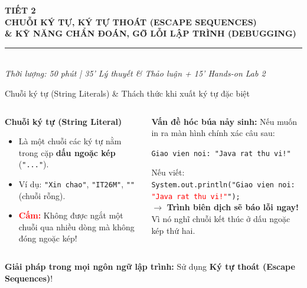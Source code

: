 \documentclass[aspectratio=169, 10pt]{beamer}
\begin{document}
\begin{frame}[plain]
  \begin{center}
    \vspace{1.5cm}
    {\Huge \textcolor{UniNavy}{\textbf{TIẾT 2}}}\\[4mm]
    {\Large \textbf{CHUỖI KÝ TỰ, KÝ TỰ THOÁT (ESCAPE SEQUENCES)}}\\[2mm]
    {\large \textbf{\& KỸ NĂNG CHẨN ĐOÁN, GỠ LỖI LẬP TRÌNH (DEBUGGING)}}\\[6mm]
    \rule{0.5\textwidth}{1pt}\\[4mm]
    \textit{\small Thời lượng: 50 phút | 35' Lý thuyết \& Thảo luận + 15' Hands-on Lab 2}
  \end{center}
\end{frame}

\begin{frame}{Chuỗi ký tự (String Literals) \& Thách thức khi xuất ký tự đặc biệt}
  \begin{columns}
    \begin{block}{\textbf{Chuỗi ký tự (String Literal)}}
      \begin{itemize}
        \item Là một chuỗi các ký tự nằm trong cặp \textbf{dấu ngoặc kép} (\texttt{"..."}).
        \item Ví dụ: \texttt{"Xin chao"}, \texttt{"IT26M"}, \texttt{""} (chuỗi rỗng).
        \item \textcolor{red}{\textbf{Cấm:}} Không được ngắt một chuỗi qua nhiều dòng mà không đóng ngoặc kép!
      \end{itemize}
    \end{block}

    \begin{alertblock}{\textbf{Vấn đề hóc búa nảy sinh:}}
      Nếu muốn in ra màn hình chính xác câu sau:
      \begin{center}
        \texttt{Giao vien noi: "Java rat thu vi!"}
      \end{center}
      Nếu viết:\\
      \texttt{System.out.println("Giao vien noi: \textcolor{red}{"Java rat thu vi!"}");}\\
      $\to$ \textbf{Trình biên dịch sẽ báo lỗi ngay!} Vì nó nghĩ chuỗi kết thúc ở dấu ngoặc kép thứ hai.
    \end{alertblock}
  \end{columns}

  \vspace{3mm}
  \begin{center}
    \textbf{Giải pháp trong mọi ngôn ngữ lập trình:} Sử dụng \textbf{Ký tự thoát (Escape Sequences)}!
  \end{center}
\end{frame}
\end{document}

